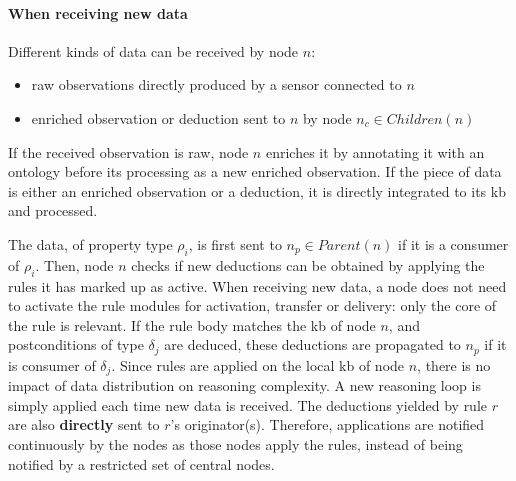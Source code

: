 \documentclass[sw]{iosart2x}
\begin{document}
\paragraph{When receiving new data}

Different kinds of data can be received by node $n$:
\begin{itemize}
	\item raw observations directly produced by a sensor connected to $n$
	\item enriched observation or deduction sent to $n$ by node $n_c \in Children(n)$
\end{itemize}
If the received observation is raw, node $n$ enriches it by annotating it with an ontology before its processing as a new enriched observation. 
If the piece of data is either an enriched observation or a deduction, it is directly integrated to its \gls{kb} and processed. 

The data, of property type $\rho_{i}$, is first sent to $n_p\in Parent(n)$ if it is a consumer of $\rho_{i}$. 
Then, node $n$ checks if new deductions can be obtained by applying the rules it has marked up as active.
When receiving new data, a node does not need to activate the rule modules for activation, transfer or delivery: only the core of the rule is relevant.
If the rule body matches the \gls{kb} of node $n$, and postconditions of type $\delta_{j}$ are deduced, these deductions are propagated to $n_p$ if it is consumer of $\delta_{j}$.
Since rules are applied on the local \gls{kb} of node $n$, there is no impact of data distribution on reasoning complexity. 
A new reasoning loop is simply applied each time new data is received.
The deductions yielded by rule $r$ are also \textbf{directly} sent to $r$'s originator(s).
Therefore, applications are notified continuously by the nodes as those nodes apply the rules, instead of being notified by a restricted set of central nodes.

%	
\end{document}
